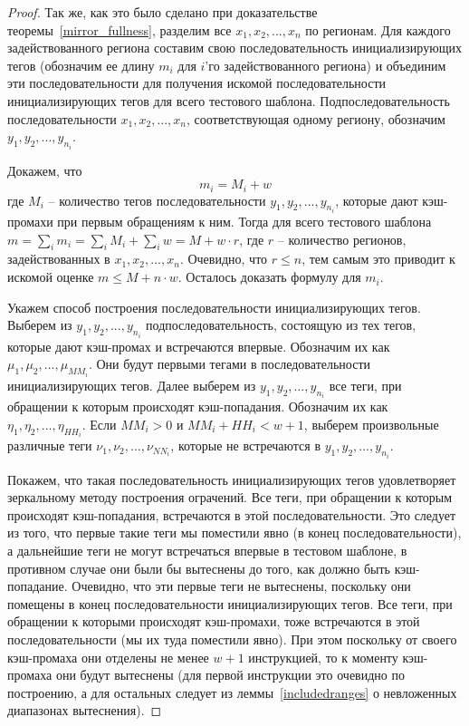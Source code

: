 \begin{proof}
  Так же, как это было сделано при доказательстве
  теоремы~\ref{mirror_fullness}, разделим все $x_1, x_2, ..., x_n$
  по регионам. Для каждого задействованного региона составим свою
  последовательность инициализирующих тегов (обозначим ее длину $m_i$
  для $i$'го задействованного региона) и объединим эти
  последовательности для получения искомой последовательности
  инициализирующих тегов для всего тестового шаблона.
  Подпоследовательность последовательности $x_1, x_2, ..., x_n$,
  соответствующая одному региону, обозначим $y_1, y_2, ...,
  y_{n_i}$.

  Докажем, что $$m_i = M_i + w$$ где $M_i$ -- количество
  тегов последовательности $y_1, y_2, ..., y_{n_i}$, которые дают
  кэш-промахи при первым обращениям к ним. Тогда для всего тестового
  шаблона $m = \sum\limits_i m_i = \sum\limits_i M_i + \sum\limits_i w =
  M + w \cdot r$, где $r$ -- количество регионов, задействованных в
  $x_1, x_2, ..., x_n$. Очевидно, что $r \leqslant n$, тем самым это
  приводит к искомой оценке $m \leqslant M + n \cdot w$. Осталось
  доказать формулу для $m_i$.

  Укажем способ построения последовательности инициализирующих
  тегов. Выберем из $y_1, y_2, ..., y_{n_i}$ подпоследовательность,
  состоящую из тех тегов, которые дают кэш-промах и встречаются
  впервые. Обозначим их как $\mu_1, \mu_2, ..., \mu_{MM_i}$. Они будут первыми тегами в
  последовательности инициализирующих тегов. Далее выберем из $y_1, y_2, ..., y_{n_i}$
  все теги, при обращении к которым происходят кэш-попадания.
  Обозначим их как $\eta_1, \eta_2, ..., \eta_{HH_i}$. Если $MM_i > 0$ и $MM_i +
  HH_i < w + 1$, выберем произвольные различные теги $\nu_1, \nu_2,
  ..., \nu_{NN_i}$, которые не встречаются в $y_1, y_2, ...,
  y_{n_i}$.

  Покажем, что такая последовательность инициализирующих тегов
  удовлетворяет зеркальному методу построения ограчений. Все теги,
  при обращении к которым происходят кэш-попадания, встречаются в
  этой последовательности. Это следует из того, что первые такие
  теги мы поместили явно (в конец последовательности), а дальнейшие
  теги не могут встречаться впервые в тестовом шаблоне, в противном
  случае они были бы вытеснены до того, как должно быть
  кэш-попадание. Очевидно, что эти первые теги не вытеснены,
  поскольку они помещены в конец последовательности инициализирующих
  тегов. Все теги, при обращении к которыми происходят кэш-промахи,
  тоже встречаются в этой последовательности (мы их туда поместили
  явно). При этом поскольку от своего кэш-промаха они отделены не
  менее $w+1$ инструкцией, то к моменту кэш-промаха они будут
  вытеснены (для первой инструкции это очевидно по построению, а
  для остальных следует из леммы~\ref{includedranges} о невложенных диапазонах вытеснения).


\end{proof}
